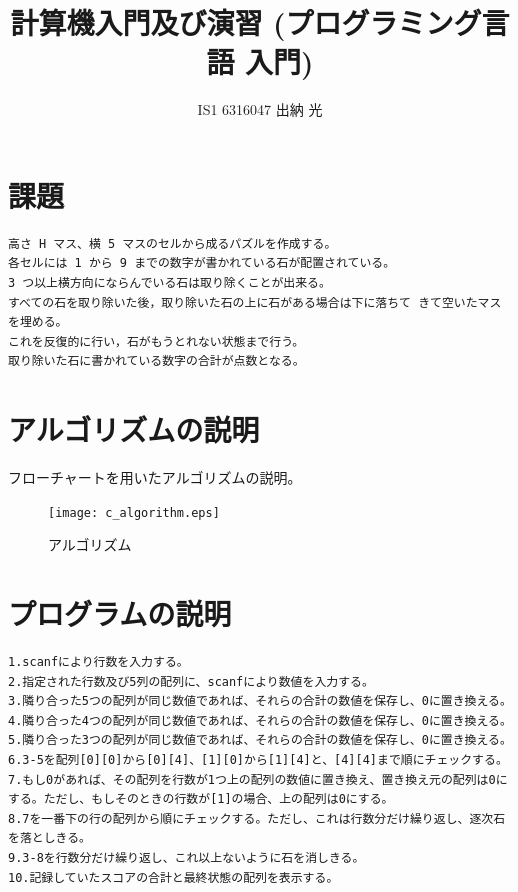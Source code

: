 \documentclass{jarticle}
\title{計算機入門及び演習 (プログラミング言語 入門)}
\author{IS1 6316047 出納 光}
\begin{document}
\maketitle

\section{課題}
\begin{verbatim}
高さ H マス、横 5 マスのセルから成るパズルを作成する。
各セルには 1 から 9 までの数字が書かれている石が配置されている。
3 つ以上横方向にならんでいる石は取り除くことが出来る。
すべての石を取り除いた後，取り除いた石の上に石がある場合は下に落ちて きて空いたマスを埋める。
これを反復的に行い，石がもうとれない状態まで行う。
取り除いた石に書かれている数字の合計が点数となる。
\end{verbatim}

\newpage
\section{アルゴリズムの説明}
フローチャートを用いたアルゴリズムの説明。
\begin{figure}[!h]
\begin{center}
\texttt{[image: c\_algorithm.eps]}
\end{center}
\caption{アルゴリズム}
\end{figure}

\newpage
\section{プログラムの説明}
\begin{verbatim}
1.scanfにより行数を入力する。
2.指定された行数及び5列の配列に、scanfにより数値を入力する。
3.隣り合った5つの配列が同じ数値であれば、それらの合計の数値を保存し、0に置き換える。
4.隣り合った4つの配列が同じ数値であれば、それらの合計の数値を保存し、0に置き換える。
5.隣り合った3つの配列が同じ数値であれば、それらの合計の数値を保存し、0に置き換える。
6.3-5を配列[0][0]から[0][4]、[1][0]から[1][4]と、[4][4]まで順にチェックする。
7.もし0があれば、その配列を行数が1つ上の配列の数値に置き換え、置き換え元の配列は0にする。ただし、もしそのときの行数が[1]の場合、上の配列は0にする。
8.7を一番下の行の配列から順にチェックする。ただし、これは行数分だけ繰り返し、逐次石を落としきる。
9.3-8を行数分だけ繰り返し、これ以上ないように石を消しきる。
10.記録していたスコアの合計と最終状態の配列を表示する。
\end{verbatim}
\end{document}
